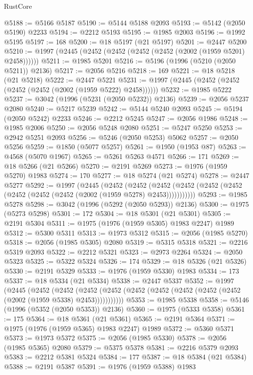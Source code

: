 \begin{lexlean}{RustCore}
\begin{coremodule}
@5188 := @5166 @5187
@5190 := @5144 @5188 @2093
@5193 := @5142 (@2050 @5190) @2233
@5194 := @2212 @5193
@5195 := @1985 @2003
@5196 := @1992 @5195
@5197 := 168
@5200 := @18 @5197 (@21 @5197)
@5201 := @2447 @5200
@5210 := @1997 (@2445 (@2452 (@2452 (@2452 (@2452 (@2002 (@1959 @5201) @2458))))))
@5211 := @1985 @5201
@5216 := @5196 (@1996 (@5210 (@2050 @5211)) @2136)
@5217 := @2056 @5216
@5218 := 169
@5221 := @18 @5218 (@21 @5218)
@5222 := @2447 @5221
@5231 := @1997 (@2445 (@2452 (@2452 (@2452 (@2452 (@2002 (@1959 @5222) @2458))))))
@5232 := @1985 @5222
@5237 := @3042 (@1996 (@5231 (@2050 @5232)) @2136)
@5239 := @2056 @5237 @2080
@5240 := @5217 @5239
@5242 := @5144 @5240 @2093
@5245 := @5194 (@2050 @5242) @2233
@5246 := @2212 @5245
@5247 := @2056 @1986
@5248 := @1985 @2006
@5250 := @2056 @5248 @2080
@5251 := @5247 @5250
@5253 := @2942 @5251 @2093
@5256 := @5246 (@2050 @5253) @5062
@5257 := @2050 @5256
@5259 := @1850 (@5077 @5257)
@5261 := @1950 (@1953 @87)
@5263 := @4568 (@5070 @1967)
@5265 := @5261 @5263 @4571
@5266 := 171
@5269 := @18 @5266 (@21 @5266)
@5270 := @2191 @5269
@5273 := @1976 (@1959 @5270) @1983
@5274 := 170
@5277 := @18 @5274 (@21 @5274)
@5278 := @2447 @5277
@5292 := @1997
    (@2445
      (@2452
        (@2452
          (@2452 (@2452 (@2452 (@2452 (@2452 (@2452 (@2452 (@2002 (@1959 @5278) @2453)))))))))))
@5293 := @1985 @5278
@5298 := @3042 (@1996 (@5292 (@2050 @5293)) @2136)
@5300 := @1975 (@5273 @5298)
@5301 := 172
@5304 := @18 @5301 (@21 @5301)
@5305 := @2191 @5304
@5311 := @1975 (@1976 (@1959 @5305) @1983 @2247) @1989
@5312 := @5300 @5311
@5313 := @1973 @5312
@5315 := @2056 (@1985 @5270)
@5318 := @2056 (@1985 @5305) @2080
@5319 := @5315 @5318
@5321 := @2216 @5319 @2093
@5322 := @2212 @5321
@5323 := @2973 @2264
@5324 := @2050 @5323
@5325 := @5322 @5324
@5326 := 174
@5329 := @18 @5326 (@21 @5326)
@5330 := @2191 @5329
@5333 := @1976 (@1959 @5330) @1983
@5334 := 173
@5337 := @18 @5334 (@21 @5334)
@5338 := @2447 @5337
@5352 := @1997
    (@2445
      (@2452
        (@2452
          (@2452 (@2452 (@2452 (@2452 (@2452 (@2452 (@2452 (@2002 (@1959 @5338) @2453)))))))))))
@5353 := @1985 @5338
@5358 := @5146 (@1996 (@5352 (@2050 @5353)) @2136)
@5360 := @1975 (@5333 @5358)
@5361 := 175
@5364 := @18 @5361 (@21 @5361)
@5365 := @2191 @5364
@5371 := @1975 (@1976 (@1959 @5365) @1983 @2247) @1989
@5372 := @5360 @5371
@5373 := @1973 @5372
@5375 := @2056 (@1985 @5330)
@5378 := @2056 (@1985 @5365) @2080
@5379 := @5375 @5378
@5381 := @2216 @5379 @2093
@5383 := @2212 @5381 @5324
@5384 := 177
@5387 := @18 @5384 (@21 @5384)
@5388 := @2191 @5387
@5391 := @1976 (@1959 @5388) @1983

\end{coremodule}
\end{lexlean}
